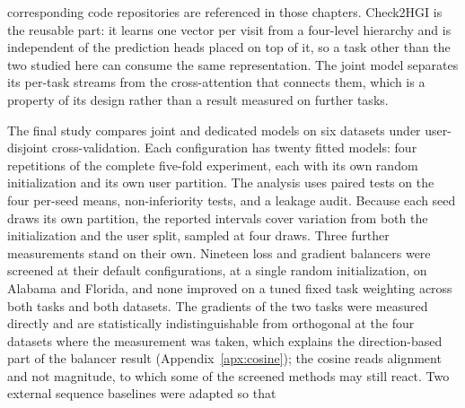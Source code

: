 \begin{description}
    corresponding code repositories are referenced in those chapters. Check2HGI is the
    reusable part: it learns one vector per visit from a four-level hierarchy and is
    independent of the prediction heads placed on top of it, so a task other than the
    two studied here can consume the same representation. The joint model separates its
    per-task streams from the cross-attention that connects them, which is a property of
    its design rather than a result measured on further tasks.
    \item[Empirical.] The final study compares joint and dedicated models on six
    datasets under user-disjoint cross-validation. Each configuration has twenty
    fitted models: four repetitions of the complete five-fold experiment, each
    with its own random initialization and its own user partition. The analysis
    uses paired tests on the four per-seed means, non-inferiority tests, and a
    leakage audit. Because each seed draws its own partition, the reported intervals
    cover variation from both the initialization and the user split, sampled at four
    draws. Three further measurements stand on their own. Nineteen loss and gradient
    balancers were screened at their default configurations, at a single random
    initialization, on Alabama and Florida, and none improved on a tuned fixed task
    weighting across both tasks and both datasets. The gradients of the two tasks were
    measured directly and are statistically indistinguishable from orthogonal at the four
    datasets where the measurement was taken, which explains the direction-based part of
    the balancer result (Appendix~\ref{apx:cosine}); the cosine reads alignment and not
    magnitude, to which some of the screened methods may still react. Two external sequence baselines were adapted so that

\end{description}
